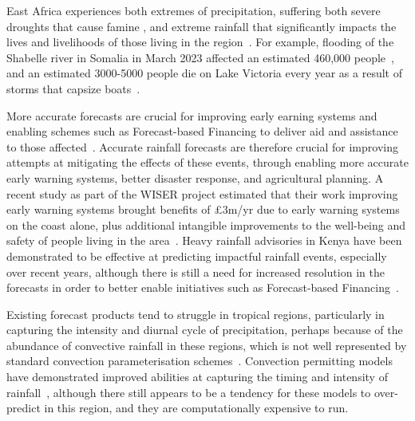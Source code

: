 \documentclass[../main.tex]{subfiles}
\begin{document}
East Africa experiences both extremes of precipitation, suffering both severe droughts that cause famine \citep{gebremeskel_haile_droughts_2019}, and extreme rainfall that significantly impacts the lives and livelihoods of those living in the region~\citep{kilavi_extreme_2018,wainwright_extreme_2021}. For example, flooding of the Shabelle river in Somalia in March 2023 affected an estimated 460,000 people~\citep{floodlist_somalia_2023}, and an estimated 3000-5000 people die on Lake Victoria every year as a result of storms that capsize boats~\citep{watkiss_socio-economic_2020}. 

More accurate forecasts are crucial for improving early earning systems and enabling schemes such as Forecast-based Financing to deliver aid and assistance to those affected~\citep{wilkinson_forecasting_2018}. Accurate rainfall forecasts are therefore crucial for improving attempts at mitigating the effects of these events, through enabling more accurate early warning systems, better disaster response, and agricultural planning. A recent study as part of the WISER project estimated that their work improving early warning systems brought benefits of £3m/yr due to early warning systems on the coast alone, plus additional intangible improvements to the well-being and safety of people living in the area~\citep{watkiss_socio-economic_2021}. Heavy rainfall advisories in Kenya have been demonstrated to be effective at predicting impactful rainfall events, especially over recent years, although there is still a need for increased resolution in the forecasts in order to better enable initiatives such as Forecast-based Financing~\citep{macleod_are_2021}.

Existing forecast products tend to struggle in tropical regions, particularly in capturing the intensity and diurnal cycle of precipitation, perhaps because of the abundance of convective rainfall in these regions, which is not well represented by standard convection parameterisation schemes~\citep{haiden_intercomparison_2012, vogel_skill_2018, woodhams_what_2018}. Convection permitting models have demonstrated improved abilities at capturing the timing and intensity of rainfall~\citep{finney_implications_2019, woodhams_what_2018}, although there still appears to be a tendency for these models to over-predict in this region, and they are computationally expensive to run.

\end{document}
